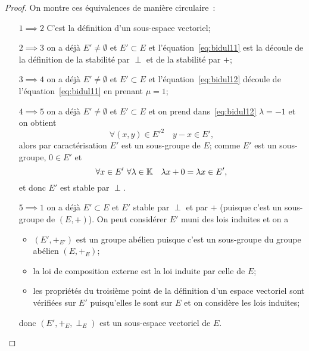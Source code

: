 \begin{proof}
  On montre ces équivalences de manière circulaire~:
  \begin{itemize}
    \item[\(1 \implies 2\)] C'est la définition d'un sous-espace vectoriel;
    \item[\(2 \implies 3\)] on a déjà \(E' \neq \emptyset\) et \(E' \subset E\)
      et l'équation~\eqref{eq:bidul11} est la découle de la définition de la
      stabilité par \(\perp\) et de la stabilité par \(+\);
    \item[\(3 \implies 4\)] on a déjà \(E' \neq \emptyset\) et \(E' \subset E\)
      et l'équation~\eqref{eq:bidul12} découle de l'équation~\eqref{eq:bidul11}
      en prenant \(\mu=1\);
    \item[\(4 \implies 5\)] on a déjà \(E' \neq \emptyset\) et \(E' \subset E\)
      et on prend dans~\eqref{eq:bidul12} \(\lambda=-1\) et on obtient
      \begin{equation}
        \forall (x,y) \in E'^2 \quad y-x \in E',
      \end{equation}
      alors par caractérisation \(E'\) est un sous-groupe de \(E\); comme \(E'\)
      est un sous-groupe, \(0 \in E'\) et
      \begin{equation}
        \forall x \in E' \ \forall \lambda \in \mathbb{K} \quad \lambda x +0=\lambda x
        \in E',
      \end{equation}
      et donc \(E'\) est stable par \(\perp\).
    \item[\(5 \implies 1\)] on a déjà \(E' \subset E\) et \(E'\) stable par
      \(\perp\) et par \(+\) (puisque c'est un sous-groupe de \((E,+)\)). On
      peut considérer \(E'\) muni des lois induites et on a
      \begin{itemize}
        \item \((E',+_{E'})\) est un groupe abélien puisque c'est un sous-groupe
          du groupe abélien \((E,+_E)\);
        \item la loi de composition externe est la loi induite par celle de
          \(E\);
        \item les propriétés du troisième point de la définition d'un espace
          vectoriel sont vérifiées sur \(E'\) puisqu'elles le sont sur \(E\) et
          on considère les lois induites;
      \end{itemize}
      donc \((E',+_E,\perp_E)\) est un sous-espace vectoriel de \(E\).
  \end{itemize}
\end{proof}

